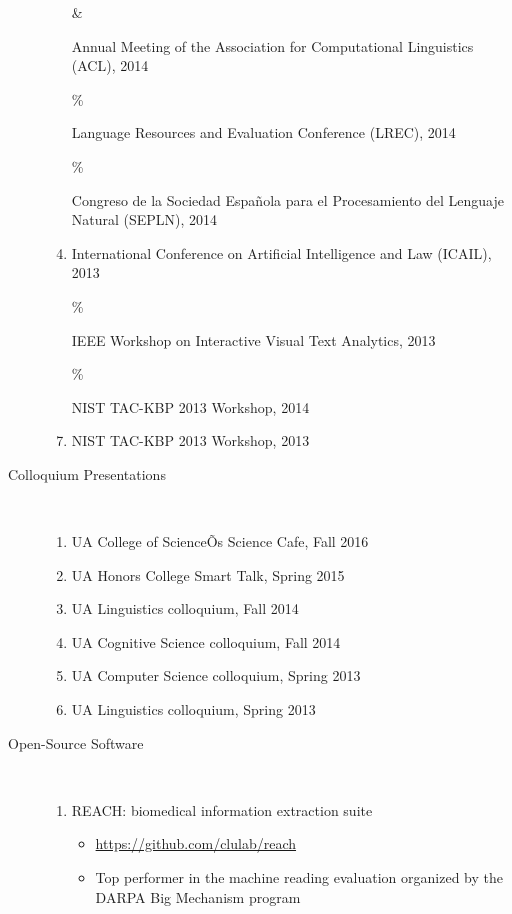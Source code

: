 \documentclass[10pt]{article}
\begin{document}
\begin{description}
\begin{enumerate}
\item 
[\& \addtocounter{enumi}{1}\theenumi ]
Annual Meeting of the Association for Computational Linguistics (ACL), 2014

\item 
[\% \addtocounter{enumi}{1}\theenumi ]
Language Resources and Evaluation Conference (LREC), 2014

\item 
[\% \addtocounter{enumi}{1}\theenumi ]
Congreso de la Sociedad Espa\~{n}ola para el Procesamiento del Lenguaje Natural (SEPLN), 2014

\item 
International Conference on Artificial Intelligence and Law (ICAIL), 2013

\item 
[\% \addtocounter{enumi}{1}\theenumi ]
IEEE Workshop on Interactive Visual Text Analytics, 2013

\item 
[\% \addtocounter{enumi}{1}\theenumi ]
NIST TAC-KBP 2013 Workshop, 2014

\item 
NIST TAC-KBP 2013 Workshop, 2013


\end{enumerate}


\item [Colloquium Presentations]\

\begin{enumerate}
\item UA College of ScienceÕs Science Cafe, Fall 2016
\item UA Honors College Smart Talk, Spring 2015
\item UA Linguistics colloquium, Fall 2014
\item UA Cognitive Science colloquium, Fall 2014
\item UA Computer Science colloquium, Spring 2013
\item UA Linguistics colloquium, Spring 2013
\end{enumerate}

\item [Open-Source Software]\

\begin{enumerate}

\item REACH: biomedical information extraction suite
\begin{itemize}
\item \url{https://github.com/clulab/reach}
\item Top performer in the machine reading evaluation organized by the DARPA Big Mechanism program
\end{itemize}


\end{enumerate}
\end{description}
\end{document}
